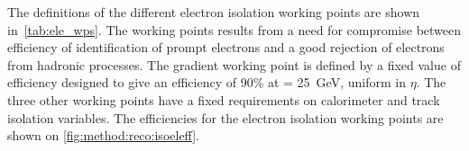 The definitions of the different electron isolation working points are shown in~\cref{tab:ele_wps}. The working points results from a need for compromise between efficiency of identification of prompt electrons and a good rejection of electrons from hadronic processes. The gradient working point is defined by a fixed value of efficiency designed to give an efficiency of 90\% at \pt = \SI{25}{\giga\electronvolt}, uniform in $\eta$.  The three other working points have a fixed requirements on calorimeter and track  isolation variables. The efficiencies for the electron isolation working points are shown on \cref{fig:method:reco:isoeleff}.

\begin{table}[]
  \centering
  \caption[Definition of the electron isolation working points and isolation efficiency $\epsilon$.]{Definition of the electron isolation working points and isolation efficiency $\epsilon$.
    In the Gradient working point definition, the unit of \pt is \SI{}{\giga\electronvolt}. All working points use a cone size
    of $\Delta R = 0.2$ for calorimeter isolation and $\Delta R_{\mathrm{max}} = 0.2$ for track isolation~\cite{Aad:2019tso}.}
  \label{tab:ele_wps}
\end{table}

